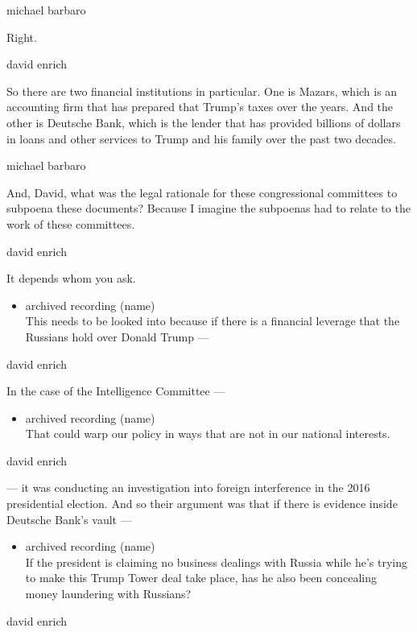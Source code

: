 michael barbaro

Right.

david enrich

So there are two financial institutions in particular. One is Mazars,
which is an accounting firm that has prepared that Trump's taxes over
the years. And the other is Deutsche Bank, which is the lender that has
provided billions of dollars in loans and other services to Trump and
his family over the past two decades.

michael barbaro

And, David, what was the legal rationale for these congressional
committees to subpoena these documents? Because I imagine the subpoenas
had to relate to the work of these committees.

david enrich

It depends whom you ask.

\begin{itemize}
\tightlist
\item
  archived recording (name)\\
  This needs to be looked into because if there is a financial leverage
  that the Russians hold over Donald Trump ---
\end{itemize}

david enrich

In the case of the Intelligence Committee ---

\begin{itemize}
\tightlist
\item
  archived recording (name)\\
  That could warp our policy in ways that are not in our national
  interests.
\end{itemize}

david enrich

--- it was conducting an investigation into foreign interference in the
2016 presidential election. And so their argument was that if there is
evidence inside Deutsche Bank's vault ---

\begin{itemize}
\tightlist
\item
  archived recording (name)\\
  If the president is claiming no business dealings with Russia while
  he's trying to make this Trump Tower deal take place, has he also been
  concealing money laundering with Russians?
\end{itemize}

david enrich

